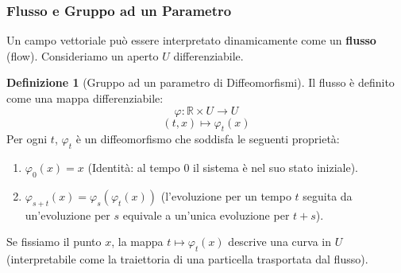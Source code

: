 \documentclass[openany]{book}
\theoremstyle{definition}
\newtheorem*{definizione}{Definizione}
\theoremstyle{remark}
\begin{document}
\subsubsection*{Flusso e Gruppo ad un Parametro}

Un campo vettoriale può essere interpretato dinamicamente come un \textbf{flusso} (flow). Consideriamo un aperto $U$ differenziabile.

\begin{definizione}[Gruppo ad un parametro di Diffeomorfismi]
    Il flusso è definito come una mappa differenziabile:
    \[
    \varphi : \mathbb{R} \times U \to U
    \]
    \[
    (t, x) \longmapsto \varphi_t(x)
    \]
    Per ogni $t$, $\varphi_t$ è un diffeomorfismo che soddisfa le seguenti proprietà:
    \begin{enumerate}
        \item $\varphi_0(x) = x$ (Identità: al tempo 0 il sistema è nel suo stato iniziale).
        \item $\varphi_{s+t}(x) = \varphi_s(\varphi_t(x))$ (l'evoluzione per un tempo $t$ seguita da un'evoluzione per $s$ equivale a un'unica evoluzione per $t+s$).
        
\begin{center}
\end{center}

    
    \end{enumerate}
\end{definizione}
Se fissiamo il punto $x$, la mappa $t \mapsto \varphi_t(x)$ descrive una curva in $U$ (interpretabile come la traiettoria di una particella trasportata dal flusso).
\end{document}
